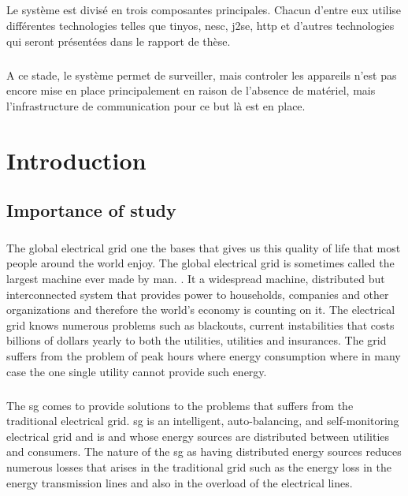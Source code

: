 \documentclass[oneside,12pt,a4paper,final]{book}
\begin{document}
\paragraph {}
Le système est divisé en trois composantes principales. Chacun d'entre eux  utilise différentes technologies telles que \gls{tinyos}, \gls{nesc}, \gls{j2se}, \gls{http} et d'autres technologies qui seront présentées dans le rapport de thèse.
\paragraph{}
A ce stade, le système permet de surveiller, mais controler les appareils n'est pas encore mise en place principalement en raison de l'absence de matériel, mais l'infrastructure de communication pour ce but là est en place.

\singlespacing

\tableofcontents
\listoffigures
\listoftables

\mainmatter
\doublespacing
\chapter{Introduction}

\section{Importance of study}
\paragraph{}
The global electrical grid one the bases that gives us this quality of life that most people around the world enjoy. The global electrical grid is sometimes called the largest machine ever made by man. \cite{ref1}. It a widespread machine, distributed but interconnected system that provides power to households, companies and other organizations and therefore the world's economy is counting on it. The electrical grid knows numerous problems such as blackouts, current instabilities that costs billions of dollars yearly to both the utilities, utilities and insurances. The grid suffers from the problem of peak hours where energy consumption where in many case the one single utility cannot provide such energy.
\paragraph{}
The \gls{sg} comes to provide solutions to the problems that suffers from the traditional electrical grid. \gls{sg} is an intelligent, auto-balancing, and self-monitoring electrical grid \cite{ref2} and is and whose energy sources are distributed between utilities and consumers. The nature of the \gls{sg} as having distributed energy sources reduces numerous losses that arises in the traditional grid such as the energy loss in the energy transmission lines and also in the overload of the electrical lines.
\end{document}
